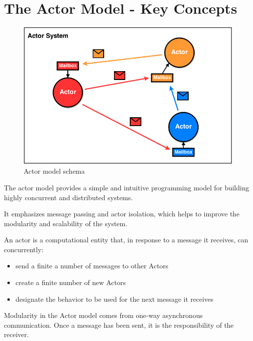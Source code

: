 \section{The Actor Model - Key Concepts}

\begin{figure}[htbp]
   \centering
   \includegraphics{images/15/actormodel.png}
   \caption{Actor model schema}
   \label{fig:15/actormodel}
\end{figure}

The actor model provides a simple and intuitive programming model for building highly concurrent and distributed systems.

It emphasizes message passing and actor isolation, which helps to improve the modularity and scalability of the system.

\begin{definition}
   [Actor]
   An actor is a computational entity that, in response to a message it receives, can concurrently:\ns
   \begin{itemize}
      \item send a finite a number of messages to other Actors
      \item create a finite number of new Actors
      \item designate the behavior to be used for the next message it receives
   \end{itemize}
\end{definition}

Modularity in the Actor model comes from one-way asynchronous communication. Once a message has been sent, it is the responsibility of the receiver.

